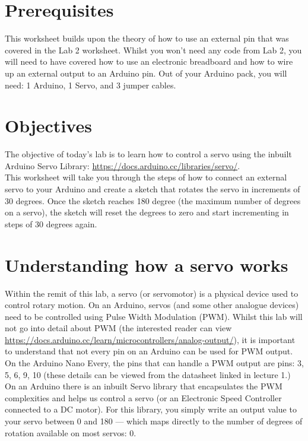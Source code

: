 \documentclass[11pt,a4paper]{article}
\begin{document}
\pagestyle{fancy}

\section*{Prerequisites}
This worksheet builds upon the theory of how to use an external pin that was covered in the Lab 2 worksheet. Whilst you won't need any code from Lab 2, you will need to have covered how to use an electronic breadboard and how to wire up an external output to an Arduino pin. Out of your Arduino pack, you will need: 1 Arduino, 1 Servo, and 3 jumper cables.

\section*{Objectives}
The objective of today's lab is to learn how to control a servo using the inbuilt Arduino Servo Library: \url{https://docs.arduino.cc/libraries/servo/}.\\

\noindent
This worksheet will take you through the steps of how to connect an external servo to your Arduino and create a sketch that rotates the servo in increments of 30 degrees. Once the sketch reaches 180 degree (the maximum number of degrees on a servo), the sketch will reset the degrees to zero and start incrementing in steps of 30 degrees again.

\section*{Understanding how a servo works}
Within the remit of this lab, a servo (or servomotor) is a physical device used to control rotary motion. On an Arduino, servos (and some other analogue devices) need to be controlled using Pulse Width Modulation (PWM). Whilst this lab will not go into detail about PWM (the interested reader can view \url{https://docs.arduino.cc/learn/microcontrollers/analog-output/}), it is important to understand that not every pin on an Arduino can be used for PWM output. On the Arduino Nano Every, the pins that can handle a PWM output are pins: 3, 5, 6, 9, 10 (these details can be viewed from the datasheet linked in lecture 1.)\\

\noindent
On an Arduino there is an inbuilt Servo library that encapsulates the PWM complexities and helps us control a servo (or an Electronic Speed Controller connected to a DC motor). For this library, you simply write an output value to your servo between 0 and 180 --- which maps directly to the number of degrees of rotation available on most servos: 0.\\
\end{document}
